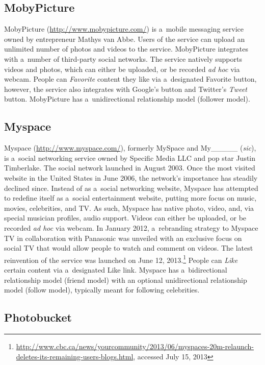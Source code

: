 \subsection{MobyPicture}

MobyPicture (\url{http://www.mobypicture.com/})
is a~mobile messaging service
owned by entrepreneur Mathys van Abbe.
Users of the service can upload an unlimited number of
photos and videos to the service.
MobyPicture integrates with a~number of
third-party social networks.
The service natively supports videos and photos,
which can either be uploaded, or be recorded \emph{ad hoc}
via webcam.
People can \emph{Favorite} content they like via
a~designated Favorite button,
however, the service also integrates with Google's
\emph{\plusone} button and Twitter's \emph{Tweet} button.
MobyPicture has a~unidirectional relationship model
(follower model).

\subsection{Myspace}

Myspace (\url{http://www.myspace.com/}),
formerly MySpace and My\_\_\_\_\_ (\emph{sic}), is
a~social networking service owned by Specific Media LLC
and pop star Justin Timberlake.
The social network launched in August 2003.
Once the most visited website
in the United States in June 2006,
the network's importance has steadily declined since.
Instead of as a~social networking website,
Myspace has attempted to redefine itself
as a~social entertainment website,
putting more focus on music, movies, celebrities, and TV.
As such, Myspace has native photo, video, and,
via special musician profiles, audio support.
Videos can either be uploaded,
or be recorded \emph{ad hoc} via webcam.
In January 2012, a~rebranding strategy to Myspace TV
in collaboration with Panasonic was unveiled
with an exclusive focus on social TV that would allow people
to watch and comment on videos.
The latest reinvention of the service was launched on June 12, 2013.\footnote{\url{http://www.cbc.ca/news/yourcommunity/2013/06/myspaces-20m-relaunch-deletes-its-remaining-users-blogs.html},
accessed July 15, 2013}
People can \emph{Like} certain content via a~designated Like link.
Myspace has a~bidirectional relationship model (friend model)
with an optional unidirectional relationship model (follow model),
typically meant for following celebrities.

\subsection{Photobucket}


